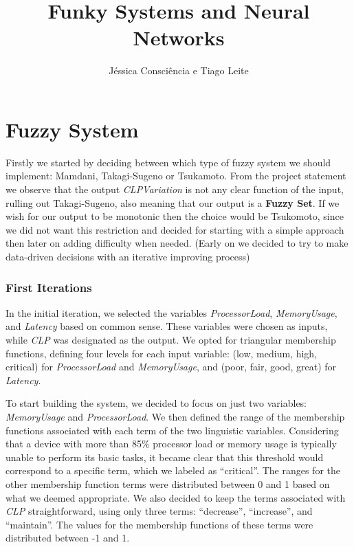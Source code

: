 \documentclass[11pt]{report}
\title{Funky Systems and Neural Networks}
\author{Jéssica Consciência e Tiago Leite}
\begin{document}
\maketitle
\newpage

\part{Fuzzy System}

Firstly we started by deciding between which type of fuzzy system
we should implement: Mamdani, Takagi-Sugeno or Tsukamoto. From the
project statement we observe that the output \textit{CLPVariation}
is not any clear function of the input, rulling out Takagi-Sugeno,
also meaning that our output is a \textbf{Fuzzy Set}. If we wish for
our output to be monotonic then the choice would be Tsukomoto, since
we did not want this restriction and decided for starting with a simple
approach then later on adding difficulty when needed.
(Early on we decided to try to make data-driven decisions with an iterative
improving process)

\section{First Iterations}

In the initial iteration, we selected the variables \textit{ProcessorLoad}, \textit{MemoryUsage}, and \textit{Latency} based on common sense.
These variables were chosen as inputs, while \textit{CLP} was designated as the output.
We opted for triangular membership functions, defining four levels for each input variable: (low, medium, high, critical) for \textit{ProcessorLoad} and \textit{MemoryUsage}, and (poor, fair, good, great) for \textit{Latency}.

To start building the system, we decided to focus on just two variables: \textit{MemoryUsage} and \textit{ProcessorLoad}.
We then defined the range of the membership functions associated with each term of the two linguistic variables.
Considering that a device with more than 85\% processor load or memory usage is typically unable to perform its basic tasks,
it became clear that this threshold would correspond to a specific term, which we labeled as ``critical''. The ranges for the other membership function terms were distributed between 0 and 1 based on what we deemed appropriate.
We also decided to keep the terms associated with \textit{CLP} straightforward, using only three terms: ``decrease'', ``increase'', and ``maintain''.
The values for the membership functions of these terms were distributed between -1 and 1.
\end{document}
